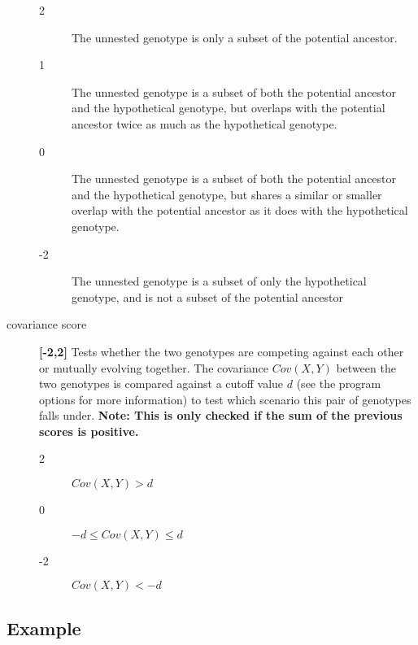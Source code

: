 \documentclass{book}
\newcommand{\unnestedlabel}{unnested genotype}
\newcommand{\ancestorlabel}{potential ancestor}
\begin{document}
\begin{description}
    \begin{description}
      \item[2]  The \unnestedlabel{} is only a subset of the \ancestorlabel{}.
      \item[1]  The \unnestedlabel{} is a subset of both the \ancestorlabel{} and the hypothetical genotype, but overlaps with the \ancestorlabel{} twice as much
        as the hypothetical genotype.
      \item[0]  The \unnestedlabel{} is a subset of both the \ancestorlabel{} and the hypothetical genotype, 
        but shares a similar or smaller overlap with the \ancestorlabel{} as it does with the hypothetical genotype. 
      \item[-2] The \unnestedlabel{} is a subset of only the hypothetical genotype, and is not a subset of the \ancestorlabel{}
    \end{description}  

  \item[covariance score]  \textbf{[-2,2]} Tests whether the two genotypes are competing against each other or mutually evolving together.
    The covariance $Cov(X,Y)$ between the two genotypes is compared against a cutoff value $d$ (see the program options for more information) to test which 
    scenario this pair of genotypes falls under. 
    \textbf{Note: This is only checked if the sum of the previous scores is positive.}
    \begin{description}
      \item[2]  $Cov(X,Y) > d$
      \item[0]  $-d \le Cov(X,Y) \le d$
      \item[-2] $Cov(X,Y) < -d$ 
    \end{description} 
\end{description}

\subsection{Example}
\end{document}
